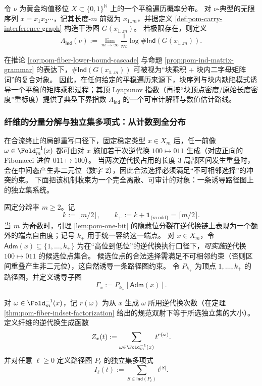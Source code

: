 
\begin{definition}\label{def:pom-ind-lyapunov-fingerprint}
令 $\nu$ 为黄金均值移位 $X\subset\{0,1\}^{\mathbb N}$ 上的一个平稳遍历概率分布。
对 $\nu$-典型的无限序列 $x=x_1x_2\cdots$，记其长度-$m$ 前缀为 $x_{1..m}$，并据定义 \ref{def:pom-carry-interference-graph} 构造干涉图 $G(x_{1..m})$。
若极限存在，则定义
\[
\Lambda_{\mathsf{Ind}}(\nu):=\lim_{m\to\infty}\frac{1}{m}\log \#\mathsf{Ind}(G(x_{1..m})).
\]
\end{definition}

\begin{remark}[随机矩阵乘积视角]\label{rem:pom-ind-random-matrix}
在推论 \ref{cor:pom-fiber-lower-bound-cascade} 与命题 \ref{prop:pom-ind-matrix-grammar} 的表达下，$\#\mathsf{Ind}(G(x_{1..m}))$ 可被视为“块乘积 + 块内二字母矩阵词”的复合对象。
因此，在任何给定的平稳遍历来源下，块序列与块内缺陷模式诱导一个平稳的矩阵乘积过程；其顶 Lyapunov 指数（再按“块顶点密度/原始长度密度”重标度）提供了典型下界指数 $\Lambda_{\mathsf{Ind}}$ 的一个可审计解释与数值估计路线。
\end{remark}

\subsubsection{纤维的分量分解与独立集多项式：从计数到全分布}\label{subsec:pom-fiber-indset}
在合流终止的局部重写口径下，固定稳定类型 \(x\in X_m\) 后，任一前像 \(\omega\in\Fold_m^{-1}(x)\) 都可由对 \(x\) 施加若干次逆代换 \(100\mapsto 011\) 生成（对应正向的 Fibonacci 进位 \(011\mapsto 100\)）。
当两次逆代换占用的长度-\(3\) 局部区间发生重叠时，会在中间态产生非二元位（数字 \(2\)），因此合法选择必须满足“不可相邻选择”的冲突约束。
下面把该机制收束为一个完全离散、可审计的对象：一条诱导路径图上的独立集系统。

\begin{definition}\label{def:pom-fiber-adm-path}
固定分辨率 \(m\ge 2\)。记
\[
k:=\lfloor m/2\rfloor,
\qquad
k_{+}:=k+\mathbf{1}_{\{m\ \mathrm{odd}\}}=\lceil m/2\rceil .
\]
当 \(m\) 为奇数时，引理 \ref{lem:pom-one-bit} 的隐藏位分裂在逆代换链上表现为一个额外的端点自由度；记号 \(k_{+}\) 用于统一容纳这一端点。
对 \(x\in X_m\)，令 \(\mathsf{Adm}(x)\subseteq\{1,\dots,k_{+}\}\) 为在“高位到低位”的逆代换执行口径下，\emph{可实施}逆代换 \(100\mapsto 011\) 的候选位点集合。
候选位点的合法选择需满足不可相邻约束（否则区间重叠产生非二元位），这自然诱导一条路径图约束。
令 \(P_{k_{+}}\) 为顶点 \(1,\dots,k_{+}\) 的路径图，并定义诱导子图
\[
\Gamma_x:=P_{k_{+}}[\mathsf{Adm}(x)].
\]
\par
对 \(\omega\in\Fold_m^{-1}(x)\)，记 \(r(\omega)\) 为从 \(x\) 生成 \(\omega\) 所用逆代换次数（在定理 \ref{thm:pom-fiber-indset-factorization} 给出的规范双射下等于所选独立集的大小）。
定义纤维的逆代换生成函数
\[
Z_x(t):=\sum_{\omega\in \Fold_m^{-1}(x)} t^{r(\omega)}.
\]
并对任意 \(\ell\ge 0\) 定义路径图 \(P_\ell\) 的独立集多项式
\[
I_\ell(t):=\sum_{S\in\mathsf{Ind}(P_\ell)} t^{|S|}.
\]
\end{definition}

